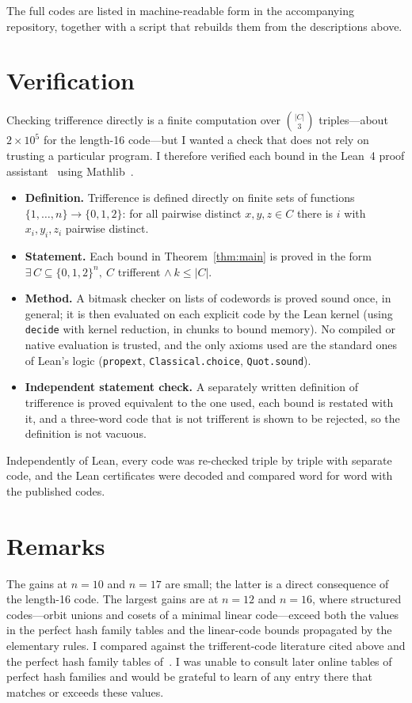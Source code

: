 \documentclass[11pt]{article}
\theoremstyle{remark}
\begin{document}
\medskip
The full codes are listed in machine-readable form in the accompanying repository, together with a script that rebuilds them from the descriptions above.

\section{Verification}

Checking trifference directly is a finite computation over $\binom{|C|}{3}$ triples---about $2\times 10^5$ for the length-16 code---but I wanted a check that does not rely on trusting a particular program.
I therefore verified each bound in the Lean~4 proof assistant~\cite{demoura2021lean4} using Mathlib~\cite{mathlib2020}.

\begin{itemize}
\item \textbf{Definition.} Trifference is defined directly on finite sets of functions $\{1,\dots,n\}\to\{0,1,2\}$: for all pairwise distinct $x,y,z\in C$ there is $i$ with $x_i,y_i,z_i$ pairwise distinct.
\item \textbf{Statement.} Each bound in Theorem~\ref{thm:main} is proved in the form $\exists\, C\subseteq\{0,1,2\}^n,\ C$ trifferent $\wedge\ k\le |C|$.
\item \textbf{Method.} A bitmask checker on lists of codewords is proved sound once, in general; it is then evaluated on each explicit code by the Lean kernel (using \texttt{decide} with kernel reduction, in chunks to bound memory). No compiled or native evaluation is trusted, and the only axioms used are the standard ones of Lean's logic (\texttt{propext}, \texttt{Classical.choice}, \texttt{Quot.sound}).
\item \textbf{Independent statement check.} A separately written definition of trifference is proved equivalent to the one used, each bound is restated with it, and a three-word code that is not trifferent is shown to be rejected, so the definition is not vacuous.
\end{itemize}

Independently of Lean, every code was re-checked triple by triple with separate code, and the Lean certificates were decoded and compared word for word with the published codes.

\section{Remarks}

The gains at $n=10$ and $n=17$ are small; the latter is a direct consequence of the length-16 code.
The largest gains are at $n=12$ and $n=16$, where structured codes---orbit unions and cosets of a minimal linear code---exceed both the values in the perfect hash family tables and the linear-code bounds propagated by the elementary rules.
I compared against the trifferent-code literature cited above and the perfect hash family tables of~\cite{walker2007}. I was unable to consult later online tables of perfect hash families and would be grateful to learn of any entry there that matches or exceeds these values.
\end{document}
